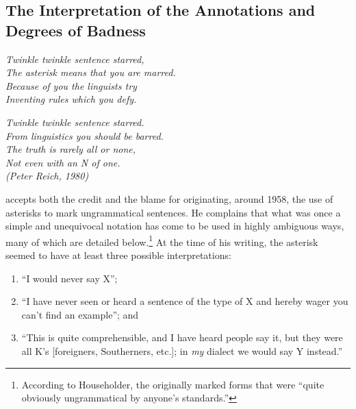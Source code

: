 \subsection{The Interpretation of the Annotations and Degrees of Badness}\label{sec:2.3.4}
\begin{flushright}
\itshape
Twinkle twinkle sentence starred,\\
The asterisk means that you are marred. \\
Because of you the linguists try \\
Inventing rules which you defy.\\
\end{flushright}
\begin{flushright}
\noindent\itshape Twinkle twinkle sentence starred.\\
From linguistics you should be barred.\\
The truth is rarely all or none,\\
Not even with an N of one.\\

\noindent\upshape (Peter Reich, 1980)\\
\end{flushright}

\citet{Householder1973} accepts both the credit and the blame for originating, around 1958, the use of asterisks to mark ungrammatical sentences.  He complains that what was once a simple and unequivocal notation has come to be used in highly ambiguous ways, many of which are detailed below.\footnote{According to Householder, the  originally marked forms that were ``quite obviously ungrammatical by anyone's standards.''}
 At the time of his writing, the asterisk seemed to have at least three possible interpretations:

\begin{enumerate}
\item ``I would never say X'';

\item ``I have never seen or heard a sentence of the type of X and hereby wager you can't find an example''; and

\item ``This is quite comprehensible, and I have heard people say it, but they were all K's [foreigners, Southerners, etc.]; in \textit{my} dialect we would say Y instead.'' \citep[370\textendash{}372]{Householder1973}

\end{enumerate}


